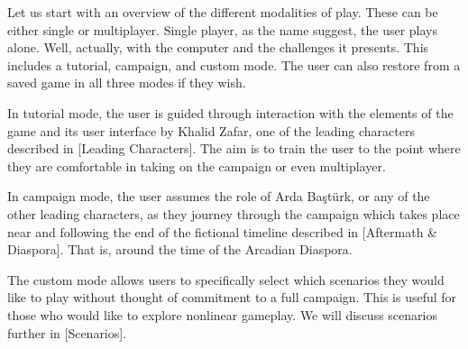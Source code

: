 
Let us start with an overview of the different modalities of play. These can be either single or multiplayer. Single player, as the name suggest, the user plays alone. Well, actually, with the computer and the challenges it presents. This includes a tutorial, campaign, and custom mode. The user can also restore from a saved game in all three modes if they wish.

In tutorial mode, the user is guided through interaction with the elements of the game and its user interface by Khalid Zafar, one of the leading characters described in [Leading Characters]. The aim is to train the user to the point where they are comfortable in taking on the campaign or even multiplayer.

In campaign mode, the user assumes the role of Arda Baştürk, or any of the other leading characters, as they journey through the campaign which takes place near and following the end of the fictional timeline described in [Aftermath & Diaspora]. That is, around the time of the Arcadian Diaspora.

The custom mode allows users to specifically select which scenarios they would like to play without thought of commitment to a full campaign. This is useful for those who would like to explore nonlinear gameplay. We will discuss scenarios further in [Scenarios]. 

